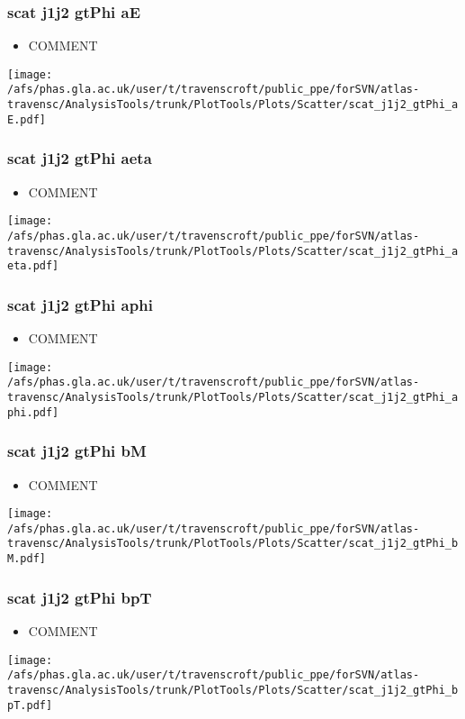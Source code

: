 \documentclass{beamer}
\begin{document}
\begin{frame}
\frametitle{scat j1j2 gtPhi aE}
\begin{itemize}
\item COMMENT
\end{itemize}
\begin{center}
\texttt{[image: /afs/phas.gla.ac.uk/user/t/travenscroft/public\_ppe/forSVN/atlas-travensc/AnalysisTools/trunk/PlotTools/Plots/Scatter/scat\_j1j2\_gtPhi\_aE.pdf]}
\end{center}
\end{frame}

\begin{frame}
\frametitle{scat j1j2 gtPhi aeta}
\begin{itemize}
\item COMMENT
\end{itemize}
\begin{center}
\texttt{[image: /afs/phas.gla.ac.uk/user/t/travenscroft/public\_ppe/forSVN/atlas-travensc/AnalysisTools/trunk/PlotTools/Plots/Scatter/scat\_j1j2\_gtPhi\_aeta.pdf]}
\end{center}
\end{frame}

\begin{frame}
\frametitle{scat j1j2 gtPhi aphi}
\begin{itemize}
\item COMMENT
\end{itemize}
\begin{center}
\texttt{[image: /afs/phas.gla.ac.uk/user/t/travenscroft/public\_ppe/forSVN/atlas-travensc/AnalysisTools/trunk/PlotTools/Plots/Scatter/scat\_j1j2\_gtPhi\_aphi.pdf]}
\end{center}
\end{frame}

\begin{frame}
\frametitle{scat j1j2 gtPhi bM}
\begin{itemize}
\item COMMENT
\end{itemize}
\begin{center}
\texttt{[image: /afs/phas.gla.ac.uk/user/t/travenscroft/public\_ppe/forSVN/atlas-travensc/AnalysisTools/trunk/PlotTools/Plots/Scatter/scat\_j1j2\_gtPhi\_bM.pdf]}
\end{center}
\end{frame}

\begin{frame}
\frametitle{scat j1j2 gtPhi bpT}
\begin{itemize}
\item COMMENT
\end{itemize}
\begin{center}
\texttt{[image: /afs/phas.gla.ac.uk/user/t/travenscroft/public\_ppe/forSVN/atlas-travensc/AnalysisTools/trunk/PlotTools/Plots/Scatter/scat\_j1j2\_gtPhi\_bpT.pdf]}
\end{center}
\end{frame}
\end{document}
